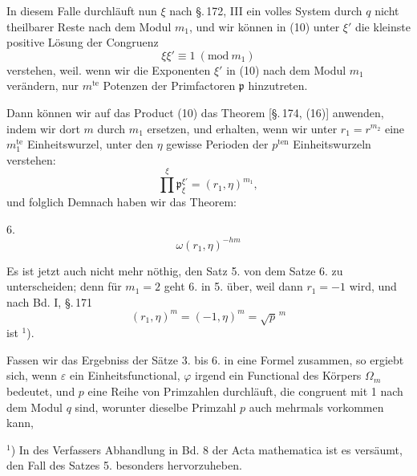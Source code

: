 
In diesem Falle durchl\"auft nun $\xi$ nach \S.\,172, III ein volles
System durch $q$ nicht theilbarer Reste nach dem Modul $m_1$, und
wir k\"onnen in (10) unter $\xi'$ die kleinste positive L\"osung der
Congruenz
\[
\xi\xi' \equiv 1\ (\mathrm{mod}\ m_1)
\]
verstehen, weil. wenn wir die Exponenten $\xi'$ in (10) nach dem %
Modul $m_1$ ver\"andern, nur $m^{\text{te}}$ Potenzen der
Primfactoren $\mathfrak{p}$ hinzutreten.

Dann k\"onnen wir auf das Product (10) das 
Theorem [\S.\,174, (16)] anwenden, indem wir dort $m$ durch $m_1$
ersetzen, und erhalten, wenn wir unter $r_1 = r^{m_2}$ eine
$m_1^{\text{te}}$ Einheitswurzel, unter den $\eta$ gewisse Perioden
der $p^{\text{ten}}$ Einheitswurzeln verstehen:
\[
\prod^{\xi} \mathfrak{p}_\xi^{\xi'} = (r_1, \eta)^{m_1},
\]
und folglich
Demnach haben wir das Theorem:

6. 
\[
\omega (r_1, \eta)^{-hm}
\]

Es ist jetzt auch nicht mehr n\"othig, den Satz 5. von dem
Satze 6. zu unterscheiden; denn f\"ur $m_1 = 2$ geht 6. in 5.
\"uber, weil dann $r_1 = -1$ wird, und nach Bd. I, \S.\,171
\[
(r_1, \eta)^m = (-1, \eta)^m = \sqrt{p}^{\,m}
\]
ist $^1$).

Fassen wir das Ergebniss der S\"atze 3. bis 6. in eine Formel
zusammen, so ergiebt sich, wenn $\varepsilon$ ein
Einheitsfunctional, $\varphi$ irgend ein Functional des K\"orpers
$\Omega_m$ bedeutet, und $p$ eine Reihe von Primzahlen durchl\"auft,
die congruent mit 1 nach dem Modul $q$ sind, worunter dieselbe
Primzahl $p$ auch mehrmals vorkommen kann,

\noindent
$^1$) In des Verfassers Abhandlung in Bd. 8 der Acta mathematica ist
es vers\"aumt, den Fall des Satzes 5. besonders hervorzuheben.
